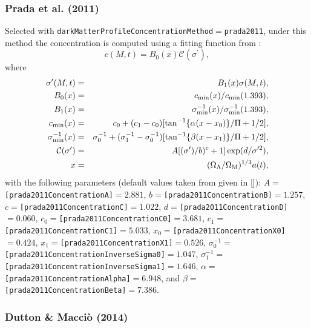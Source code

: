 \subsubsection{Prada et al. (2011)}\label{phys:darkMatterProfileConcentration:darkMatterProfileConcentrationPrada2011}

Selected with {\tt darkMatterProfileConcentrationMethod}$=${\tt prada2011}, under this method the concentration is computed using a fitting function from \cite{prada_halo_2011}:
\begin{equation}
c(M,t) = B_0(x) \mathcal{C}(\sigma^\prime),
\end{equation}
where
\begin{eqnarray}
\sigma^\prime(M,t) &=& B_1(x) \sigma(M,t), \\
B_0(x) &=& c_{\rm min}(x)/c_{\rm min}(1.393), \\
B_1(x) &=& \sigma^{-1}_{\rm min}(x)/\sigma^{-1}_{\rm min}(1.393), \\
c_{\rm min}(x) &=& c_0 + (c_1-c_0) [\tan^{-1}\{\alpha (x-x_0)\}/\Pi+1/2], \\
\sigma^{-1}_{\rm min}(x) &=& \sigma^{-1}_0 + (\sigma^{-1}_1-\sigma^{-1}_0) [\tan^{-1}\{\beta(x-x_1)\}/\Pi+1/2], \\
\mathcal{C}(\sigma^\prime) &=& A [(\sigma^\prime)/b)^c+1] \exp(d/\sigma^{\prime 2}), \\
x &=& (\Omega_\Lambda/\Omega_{\rm M})^{1/3} a(t),
\end{eqnarray}
with the following parameters (default values taken from \cite{prada_halo_2011} given in []): $A=${\tt [prada2011ConcentrationA]}$=2.881$, $b=${\tt [prada2011ConcentrationB]}$=1.257$, $c=${\tt [prada2011ConcentrationC]}$=1.022$, $d=${\tt [prada2011ConcentrationD]}$=0.060$, $c_0=${\tt [prada2011ConcentrationC0]}$=3.681$, $c_1=${\tt [prada2011ConcentrationC1]}$=5.033$, $x_0=${\tt [prada2011ConcentrationX0]}$=0.424$, $x_1=${\tt [prada2011ConcentrationX1]}$=0.526$, $\sigma^{-1}_0=${\tt [prada2011ConcentrationInverseSigma0]}$=1.047$, $\sigma^{-1}_1=${\tt [prada2011ConcentrationInverseSigma1]}$=1.646$, $\alpha=${\tt [prada2011ConcentrationAlpha]}$=6.948$, and $\beta=${\tt [prada2011ConcentrationBeta]}$=7.386$.

\subsubsection{Dutton \& Macci\`o (2014)}\label{phys:darkMatterProfileConcentration:darkMatterProfileConcentrationDuttonMaccio2014}

